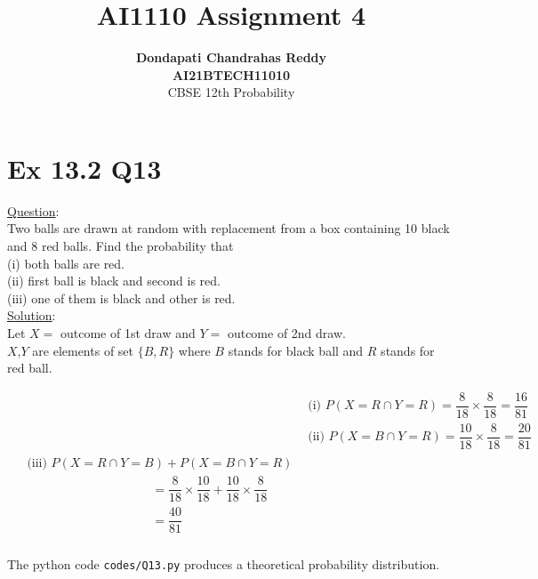 \documentclass[journal,12pt,twocolumn]{IEEEtran}
\begin{document}
\title{\textbf{AI1110 Assignment 4} }
\author{\textbf{Dondapati Chandrahas Reddy}\\\textbf{AI21BTECH11010}\\ CBSE 12th Probability}
\maketitle

{\section{Ex 13.2 Q13}}

{\large \underline{Question}:}\\

Two balls are drawn at random with replacement from a box containing 10 black
and 8 red balls. Find the probability that\\
(i) both balls are red.\\
(ii) first ball is black and second is red.\\
(iii) one of them is black and other is red.\\

{\large \underline{Solution}:}\\

Let $X=$ outcome of 1st draw and $Y=$ outcome of 2nd draw.\\

$X$,$Y$ are elements of set $\{B,R\}$ where $B$ stands for black ball and $R$ stands for red ball.

\begin{align}
	&\text{(i) } P(X=R \cap Y=R) = \dfrac{8}{18} \times \dfrac{8}{18}  = \dfrac{16}{81}\\[1em]
	&\text{(ii) } P(X=B \cap Y=R) = \dfrac{10}{18} \times \dfrac{8}{18}  = \dfrac{20}{81}\\[1em]
	\begin{split}
	&\text{(iii) } P(X=R \cap Y=B) + P(X=B \cap Y=R)\\[1ex]
	& \hspace{120pt} = \dfrac{8}{18} \times \dfrac{10}{18} + \dfrac{10}{18} \times \dfrac{8}{18}\\[1ex]
	&  \hspace{120pt} = \dfrac{40}{81} 
	\end{split}
\end{align}\\

The python code \texttt{codes/Q13.py} produces a theoretical probability distribution.
\end{document}
